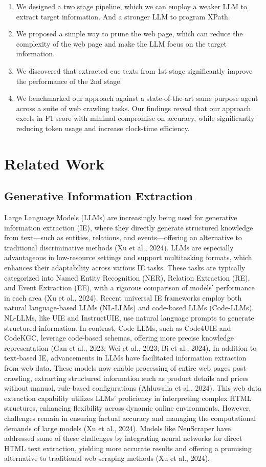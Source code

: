 \documentclass[a4paper]{article}
\begin{document}
\begin{enumerate}
  \item We designed a two stage pipeline, which we can employ a weaker LLM to extract target information. And a stronger LLM to program XPath.
  \item We proposed a simple way to prune the web page, which can reduce the complexity of the web page and make the LLM focus on the target information.
  \item We discovered that extracted cue texts from 1st stage significantly improve the performance of the 2nd stage.
  \item We benchmarked our approach against a state-of-the-art same purpose agent across a suite of web crawling tasks. Our findings reveal that our approach excels in F1 score with minimal compromise on accuracy, while significantly reducing token usage and increase clock-time efficiency.
\end{enumerate}

\section{Related Work}
\subsection{Generative Information Extraction}
Large Language Models (LLMs) are increasingly being used for generative information extraction (IE), where they directly generate structured knowledge from text—such as entities, relations, and events—offering an alternative to traditional discriminative methods (Xu et al., 2024). LLMs are especially advantageous in low-resource settings and support multitasking formats, which enhances their adaptability across various IE tasks. These tasks are typically categorized into Named Entity Recognition (NER), Relation Extraction (RE), and Event Extraction (EE), with a rigorous comparison of models’ performance in each area (Xu et al., 2024).
  Recent universal IE frameworks employ both natural language-based LLMs (NL-LLMs) and code-based LLMs (Code-LLMs). NL-LLMs, like UIE and InstructUIE, use natural language prompts to generate structured information. In contrast, Code-LLMs, such as Code4UIE and CodeKGC, leverage code-based schemas, offering more precise knowledge representation (Gan et al., 2023; Wei et al., 2023; Bi et al., 2024). In addition to text-based IE, advancements in LLMs have facilitated information extraction from web data. These models now enable processing of entire web pages post-crawling, extracting structured information such as product details and prices without manual, rule-based configurations (Ahluwalia et al., 2024). This web data extraction capability utilizes LLMs’ proficiency in interpreting complex HTML structures, enhancing flexibility across dynamic online environments. However, challenges remain in ensuring factual accuracy and managing the computational demands of large models (Xu et al., 2024). Models like NeuScraper have addressed some of these challenges by integrating neural networks for direct HTML text extraction, yielding more accurate results and offering a promising alternative to traditional web scraping methods (Xu et al., 2024).
\end{document}

